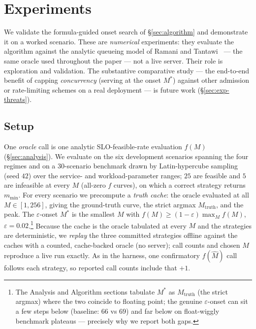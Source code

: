 \section{Experiments}
\label{sec:experiments}

We validate the formula-guided onset search of \S\ref{sec:algorithm} and demonstrate it on a
worked scenario. These are \emph{numerical} experiments: they evaluate the algorithm against
the analytic queueing model of Ramani and Tantawi~\cite{ramani2026queueing} --- the same oracle
used throughout the paper --- not a live server. Their role is exploration and validation. The
substantive comparative study --- the end-to-end benefit of capping \emph{concurrency} (serving
at the onset $M^\ast$) against other admission or rate-limiting schemes on a real deployment ---
is future work (\S\ref{sec:exp-threats}).

\subsection{Setup}
\label{sec:exp-setup}
One \emph{oracle} call is one analytic SLO-feasible-rate evaluation $f(M)$ (\S\ref{sec:analysis}).
We evaluate on the six development scenarios spanning the four regimes and on a $30$-scenario
benchmark drawn by Latin-hypercube sampling (seed $42$) over the service- and workload-parameter
ranges; $25$ are feasible and $5$ are infeasible at every $M$ (all-zero $f$ curves), on which a
correct strategy returns $m_{\min}$. For every scenario we precompute a \emph{truth cache}: the
oracle evaluated at all $M\in[1,256]$, giving the ground-truth curve, the strict argmax
$M_{\mathrm{truth}}$, and the peak. The $\varepsilon$-onset $M^\ast$ is the smallest $M$ with
$f(M)\ge(1-\varepsilon)\max_M f(M)$, $\varepsilon=0.02$.\footnote{The Analysis and Algorithm
sections tabulate $M^\ast$ as $M_{\mathrm{truth}}$ (the strict argmax) where the two coincide to
floating point; the genuine $\varepsilon$-onset can sit a few steps below (baseline: $66$ vs
$69$) and far below on float-wiggly benchmark plateaus --- precisely why we report both gaps.}
Because the cache is the oracle tabulated at every $M$ and the strategies are deterministic, we
\emph{replay} the three committed strategies offline against the caches with a counted,
cache-backed oracle (no server); call counts and chosen $M$ reproduce a live run exactly. As in
the harness, one confirmatory $f(\hat M)$ call follows each strategy, so reported call counts
include that $+1$.

